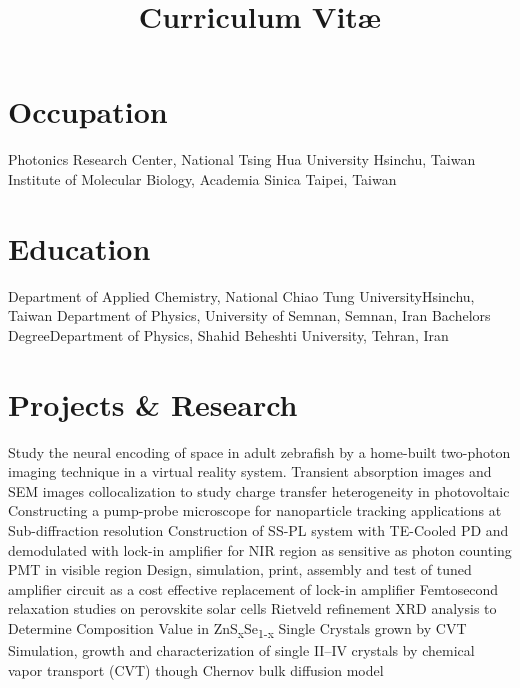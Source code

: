 \documentclass[11pt,a4paper]{moderncv}
\title{Curriculum Vit\ae}
\begin{document}
\makecvtitle
\vspace{-1.5cm}
\section{Occupation}
		{Photonics Research Center, National Tsing Hua University}
		{Hsinchu, Taiwan}{}{}
		{Institute of Molecular Biology, Academia Sinica}
		{Taipei, Taiwan}{}{}
\section{Education}
		{Department of Applied Chemistry, National Chiao
		Tung University}{Hsinchu, Taiwan}{}{}
		{Department of Physics, University of Semnan, Semnan, Iran}{}{}{}
		{Bachelors Degree}{Department of Physics, Shahid 
		Beheshti University, Tehran, Iran}{}{}{}
\section{Projects \& Research}
		{Study the neural encoding of space in adult zebrafish 
		by a home-built two-photon 
		imaging technique in a virtual reality system.}
		{Transient absorption images and SEM images collocalization 
		to study charge transfer heterogeneity in photovoltaic}
		{Constructing a pump-probe microscope for nanoparticle tracking 
		applications at Sub-diffraction resolution}
		{Construction of SS-PL system with TE-Cooled PD 
		and demodulated with lock-in amplifier for NIR region as 
		sensitive as photon counting PMT in visible region}
		{Design, simulation, print, assembly and test 
		of tuned amplifier circuit as a cost effective replacement 
		of lock-in amplifier}
		{Femtosecond relaxation studies on perovskite solar cells}
		{Rietveld refinement XRD analysis to 
		Determine Composition Value in ZnS\textsubscript{x}Se\textsubscript{1-x} 
		Single Crystals grown by CVT}
		{Simulation, growth and characterization 
		of single II--IV crystals 
		by chemical vapor transport (CVT) though Chernov bulk diffusion model}
\end{document}

